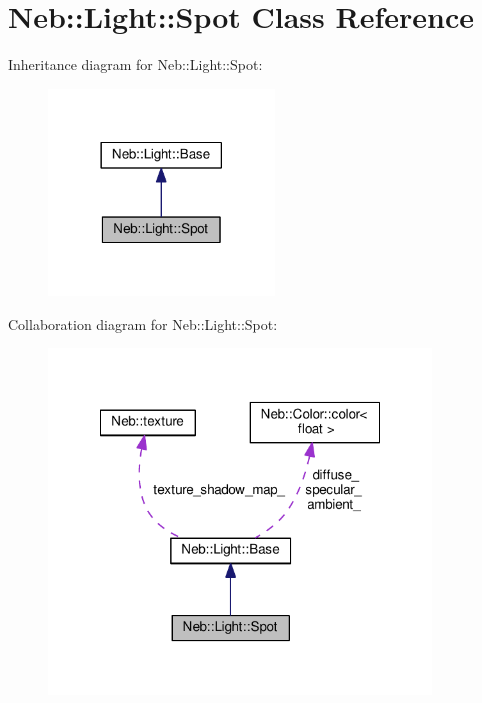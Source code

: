 \hypertarget{classNeb_1_1Light_1_1Spot}{\section{Neb\-:\-:Light\-:\-:Spot Class Reference}
\label{classNeb_1_1Light_1_1Spot}
}


Inheritance diagram for Neb\-:\-:Light\-:\-:Spot\-:
\nopagebreak
\begin{figure}[H]
\begin{center}
\leavevmode
\includegraphics[width=170pt]{classNeb_1_1Light_1_1Spot__inherit__graph}
\end{center}
\end{figure}


Collaboration diagram for Neb\-:\-:Light\-:\-:Spot\-:
\nopagebreak
\begin{figure}[H]
\begin{center}
\leavevmode
\includegraphics[width=288pt]{classNeb_1_1Light_1_1Spot__coll__graph}
\end{center}
\end{figure}
